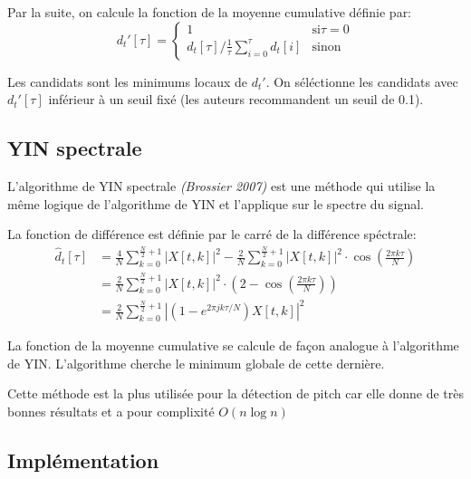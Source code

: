 \documentclass[]{article}
\begin{document}
Par la suite, on calcule la fonction de la moyenne cumulative définie
par: \[d_t'[\tau] = \begin{cases} 1 &\text{si} \tau = 0\\
d_t[\tau] / \frac{1}{\tau}\sum\limits_{i=0}^{\tau}d_t[i] &\text{sinon}
\end{cases}\]

Les candidats sont les minimums locaux de \(d_t'\). On séléctionne les
candidats avec \(d_t'[\tau]\) inférieur à un seuil fixé (les auteurs
recommandent un seuil de 0.1).

\hypertarget{yin-spectrale}{%
\subsection{YIN spectrale}\label{yin-spectrale}}

L'algorithme de YIN spectrale \emph{(Brossier 2007)} est une méthode qui
utilise la même logique de l'algorithme de YIN et l'applique sur le
spectre du signal.

La fonction de différence est définie par le carré de la différence
spéctrale: \begin{align*}
\hat{d}_t[\tau] &= \frac{4}{N} \sum\limits_{k=0}^{\frac{N}{2}+1} \left\lvert X[t,k] \right\rvert^2
       - \frac{2}{N} \sum\limits_{k=0}^{\frac{N}{2}+1} \left\lvert X[t,k] \right\rvert^2
       \cdot \cos \left( \frac{2\pi k\tau}{N} \right) \\
    &= \frac{2}{N} \sum\limits_{k=0}^{\frac{N}{2}+1} \left\lvert X[t,k] \right\rvert^2
       \cdot \left( 2 - \cos \left( \frac{2\pi k\tau}{N} \right) \right) \\
    &= \frac{2}{N} \sum\limits_{k=0}^{\frac{N}{2}+1}
       \left\lvert\left( 1-e^{2\pi jk\tau/N} \right) X[t,k] \right\rvert^2
\end{align*}

La fonction de la moyenne cumulative se calcule de façon analogue à
l'algorithme de YIN. L'algorithme cherche le minimum globale de cette
dernière.

Cette méthode est la plus utilisée pour la détection de pitch car elle
donne de très bonnes résultats et a pour complixité \(O(n\log n)\)

\hypertarget{implementation-1}{%
\subsection{Implémentation}\label{implementation-1}}
\end{document}
